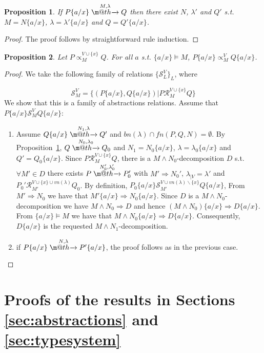 \documentclass[submission,copyright,creativecommons]{eptcs}
\makeatletter
\newcommand{\fn}{\mathit{fn}}
\newcommand{\bn}{\mathit{bn}}
\newcommand{\vn}{\mathit{vn}}
\newcommand{\act}{\lambda}
\newcommand{\tr}[1]{\stackrel{#1}{\rightarrowfill}}
\def \rightarrowfill{\m@th\mathord{\smash-}\mkern-6mu\cleaders\hbox{$\mkern-2mu\mathord{\smash-}\mkern-2mu$}\hfill
  \mkern-6mu\mathord\rightarrow}
\newtheorem{proposition}{Proposition}
\makeatother
\begin{document}
\begin{proposition} 
\label{prop:symbinstantiation}
If $P\{a/x\}\tr{M,\lambda} Q$ then there exist $N$, $\lambda'$ and $Q'$ s.t.
$M=N\{a/x\}$, $\lambda = \lambda'\{a/x\}$ and $Q= Q'\{a/x\}$. 
\end{proposition}

\begin{proof} The proof follows by straightforward rule induction.
\end{proof}


\begin{proposition} 
\label{prop:visible-cut}
Let $P\propto^{V\cup\{x\}}_M Q$. For all $a$ s.t. $\{a/x\}\models M$, 
 $P\{a/x\}\propto^{V}_M Q\{a/x\}$.
\end{proposition}

\begin{proof}  We take the following family of relations $\{\mathcal{S}^V_L\}_L$, where 

\[\mathcal{S}^V_M = \{(P\{a/x\},Q\{a/x\}) | P \mathcal{R}^{V\cup\{x\}}_M Q\}\]
We show that this is 
a family of abstractions relations. 
Assume that $P\{a/x\}\mathcal{S}^V_M Q\{a/x\}$:

 \begin{enumerate}
 \item Assume $Q\{a/x\} \tr {N_1, \act} Q'$ and $\bn(\act)\cap\fn(P,Q,N) =\emptyset$. By Proposition~\ref{prop:symbinstantiation},
 $Q \tr {N_0, \act_0} Q_0$ and $N_1 = N_0\{a/x\}$, $\act = \act_0\{a/x\}$ and $Q'=Q_0\{a/x\}$. Since
  $P \mathcal{R}^{V\cup\{x\}}_M Q$, there is a $M\wedge N_0$-decomposition $D$ s.t. $\forall M'\in D$
  there exists $P\tr{N_0',\act_0'} P_0'$ with $M'\Rightarrow N_0'$, $\act_{|V} = \act'$ and
   $P_0' \mathcal{R}^{V\cup\{x\}\cup\vn(\act)}_{M'} Q_0$. By definition, $P_0\{a/x\}\mathcal{S}^{V\cup\vn(\act)\backslash\{x\}}_{M'} Q\{a/x\}$,
   From  $M' \Rightarrow N_0$ we have that $M'\{a/x\} \Rightarrow N_0\{a/x\}$. Since $D$ is a $M\wedge N_0$-decomposition
   we have $M\wedge N_0 \Rightarrow D$ and hence $(M\wedge N_0) \{a/x\}\Rightarrow D\{a/x\}$. From
   $\{a/x\}\models M$ we have that $M\wedge N_0 \{a/x\}\Rightarrow D\{a/x\}$. Consequently, 
   $D\{a/x\}$ is the requested $M\wedge N_1$-decomposition. 
 \item if $P\{a/x\} \tr {N, \act} P'\{a/x\}$, the proof follows as in the previous case. 
\end{enumerate}
\end{proof}

\section{Proofs of the results in Sections \ref{sec:abstractions} and \ref{sec:typesystem}} \label{app:proofs}
\end{document}
